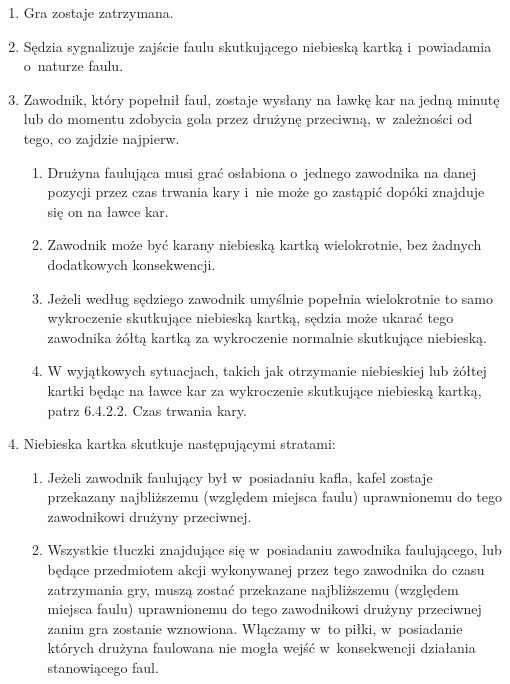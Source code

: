 \documentclass[12pt,a4paper]{article}
\begin{document}
\begin{enumerate}
	\item
	      Gra zostaje zatrzymana.
	\item
	      Sędzia sygnalizuje zajście faulu skutkującego niebieską kartką i~powiadamia o~naturze faulu.
	\item
	      Zawodnik, który popełnił faul, zostaje wysłany na ławkę kar na jedną
	      minutę lub do momentu zdobycia gola przez drużynę przeciwną, w~zależności od tego, co zajdzie najpierw.

	      \begin{enumerate}
		      \item
		            Drużyna faulująca musi grać osłabiona o~jednego zawodnika na danej
		            pozycji przez czas trwania kary i~nie może go zastąpić dopóki
		            znajduje się on na ławce kar.
		      \item
		            Zawodnik może być karany niebieską kartką wielokrotnie, bez żadnych
		            dodatkowych konsekwencji.
		      \item
		            Jeżeli według sędziego zawodnik umyślnie popełnia wielokrotnie to
		            samo wykroczenie skutkujące niebieską kartką, sędzia może ukarać
		            tego zawodnika żółtą kartką za wykroczenie normalnie skutkujące
		            niebieską.
		      \item
		            W wyjątkowych sytuacjach, takich jak otrzymanie niebieskiej lub
		            żółtej kartki będąc na ławce kar za wykroczenie skutkujące niebieską
		            kartką, patrz 6.4.2.2. Czas trwania kary.
	      \end{enumerate}
	\item
	      Niebieska kartka skutkuje następującymi stratami:

	      \begin{enumerate}
		      \item
		            Jeżeli zawodnik faulujący był w~posiadaniu kafla, kafel zostaje
		            przekazany najbliższemu (względem miejsca faulu)
		            uprawnionemu do tego zawodnikowi drużyny przeciwnej.
		      \item
		            Wszystkie tłuczki znajdujące się w~posiadaniu zawodnika faulującego, lub
		            będące przedmiotem akcji wykonywanej przez tego zawodnika do czasu zatrzymania gry, muszą
		            zostać przekazane najbliższemu (względem miejsca faulu) uprawnionemu do tego zawodnikowi drużyny przeciwnej zanim gra
		            zostanie wznowiona. Włączamy w~to piłki, w~posiadanie których
		            drużyna faulowana nie mogła wejść w~konsekwencji działania
		            stanowiącego faul.


\end{enumerate}
\end{enumerate}
\end{document}
